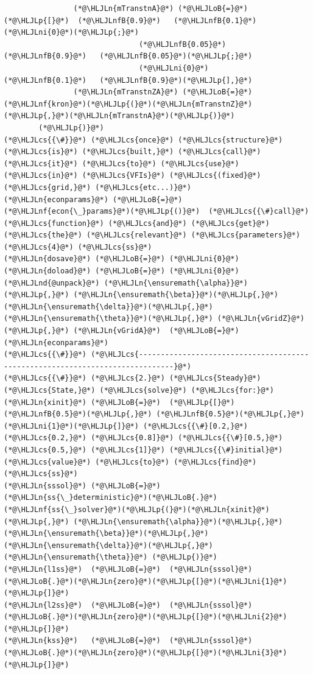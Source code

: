 \documentclass[12pt,a4paper]{article}
\newcommand{\HLJLn}[1]{#1}
\newcommand{\HLJLnd}[1]{\textcolor[RGB]{214,102,97}{#1}}
\newcommand{\HLJLnf}[1]{\textcolor[RGB]{66,102,213}{#1}}
\newcommand{\HLJLnfB}[1]{\textcolor[RGB]{59,151,46}{#1}}
\newcommand{\HLJLni}[1]{\textcolor[RGB]{59,151,46}{#1}}
\newcommand{\HLJLoB}[1]{\textcolor[RGB]{102,102,102}{\textbf{#1}}}
\newcommand{\HLJLp}[1]{#1}
\newcommand{\HLJLcs}[1]{\textcolor[RGB]{153,153,119}{\textit{#1}}}
\begin{document}
\begin{lstlisting}
                (*@\HLJLn{mTranstnA}@*) (*@\HLJLoB{=}@*) (*@\HLJLp{[}@*)  (*@\HLJLnfB{0.9}@*)   (*@\HLJLnfB{0.1}@*)   (*@\HLJLni{0}@*)(*@\HLJLp{;}@*)
                               (*@\HLJLnfB{0.05}@*)  (*@\HLJLnfB{0.9}@*)   (*@\HLJLnfB{0.05}@*)(*@\HLJLp{;}@*)
                               (*@\HLJLni{0}@*)     (*@\HLJLnfB{0.1}@*)   (*@\HLJLnfB{0.9}@*)(*@\HLJLp{],}@*)
                (*@\HLJLn{mTranstnZA}@*) (*@\HLJLoB{=}@*) (*@\HLJLnf{kron}@*)(*@\HLJLp{(}@*)(*@\HLJLn{mTranstnZ}@*)(*@\HLJLp{,}@*)(*@\HLJLn{mTranstnA}@*)(*@\HLJLp{)}@*)
        (*@\HLJLp{)}@*)
(*@\HLJLcs{{\#}}@*) (*@\HLJLcs{once}@*) (*@\HLJLcs{structure}@*) (*@\HLJLcs{is}@*) (*@\HLJLcs{built,}@*) (*@\HLJLcs{call}@*) (*@\HLJLcs{it}@*) (*@\HLJLcs{to}@*) (*@\HLJLcs{use}@*) (*@\HLJLcs{in}@*) (*@\HLJLcs{VFIs}@*) (*@\HLJLcs{(fixed}@*) (*@\HLJLcs{grid,}@*) (*@\HLJLcs{etc...)}@*)
(*@\HLJLn{econparams}@*) (*@\HLJLoB{=}@*) (*@\HLJLnf{econ{\_}params}@*)(*@\HLJLp{()}@*)  (*@\HLJLcs{{\#}call}@*) (*@\HLJLcs{function}@*) (*@\HLJLcs{and}@*) (*@\HLJLcs{get}@*) (*@\HLJLcs{the}@*) (*@\HLJLcs{relevant}@*) (*@\HLJLcs{parameters}@*) (*@\HLJLcs{4}@*) (*@\HLJLcs{ss}@*)
(*@\HLJLn{dosave}@*) (*@\HLJLoB{=}@*) (*@\HLJLni{0}@*)
(*@\HLJLn{doload}@*) (*@\HLJLoB{=}@*) (*@\HLJLni{0}@*)
(*@\HLJLnd{@unpack}@*) (*@\HLJLn{\ensuremath{\alpha}}@*)(*@\HLJLp{,}@*) (*@\HLJLn{\ensuremath{\beta}}@*)(*@\HLJLp{,}@*) (*@\HLJLn{\ensuremath{\delta}}@*)(*@\HLJLp{,}@*) (*@\HLJLn{\ensuremath{\theta}}@*)(*@\HLJLp{,}@*) (*@\HLJLn{vGridZ}@*)(*@\HLJLp{,}@*) (*@\HLJLn{vGridA}@*)  (*@\HLJLoB{=}@*) (*@\HLJLn{econparams}@*)
(*@\HLJLcs{{\#}}@*) (*@\HLJLcs{------------------------------------------------------------------------------}@*)
(*@\HLJLcs{{\#}}@*) (*@\HLJLcs{2.}@*) (*@\HLJLcs{Steady}@*) (*@\HLJLcs{State,}@*) (*@\HLJLcs{solve}@*) (*@\HLJLcs{for:}@*)
(*@\HLJLn{xinit}@*) (*@\HLJLoB{=}@*)  (*@\HLJLp{[}@*)(*@\HLJLnfB{0.5}@*)(*@\HLJLp{,}@*) (*@\HLJLnfB{0.5}@*)(*@\HLJLp{,}@*) (*@\HLJLni{1}@*)(*@\HLJLp{]}@*) (*@\HLJLcs{{\#}[0.2,}@*) (*@\HLJLcs{0.2,}@*) (*@\HLJLcs{0.8]}@*) (*@\HLJLcs{{\#}[0.5,}@*) (*@\HLJLcs{0.5,}@*) (*@\HLJLcs{1]}@*) (*@\HLJLcs{{\#}initial}@*) (*@\HLJLcs{value}@*) (*@\HLJLcs{to}@*) (*@\HLJLcs{find}@*) (*@\HLJLcs{ss}@*)
(*@\HLJLn{sssol}@*) (*@\HLJLoB{=}@*)  (*@\HLJLn{ss{\_}deterministic}@*)(*@\HLJLoB{.}@*)(*@\HLJLnf{ss{\_}solver}@*)(*@\HLJLp{(}@*)(*@\HLJLn{xinit}@*)(*@\HLJLp{,}@*) (*@\HLJLn{\ensuremath{\alpha}}@*)(*@\HLJLp{,}@*) (*@\HLJLn{\ensuremath{\beta}}@*)(*@\HLJLp{,}@*) (*@\HLJLn{\ensuremath{\delta}}@*)(*@\HLJLp{,}@*) (*@\HLJLn{\ensuremath{\theta}}@*) (*@\HLJLp{)}@*)
(*@\HLJLn{l1ss}@*)  (*@\HLJLoB{=}@*)  (*@\HLJLn{sssol}@*)(*@\HLJLoB{.}@*)(*@\HLJLn{zero}@*)(*@\HLJLp{[}@*)(*@\HLJLni{1}@*)(*@\HLJLp{]}@*)
(*@\HLJLn{l2ss}@*)  (*@\HLJLoB{=}@*)  (*@\HLJLn{sssol}@*)(*@\HLJLoB{.}@*)(*@\HLJLn{zero}@*)(*@\HLJLp{[}@*)(*@\HLJLni{2}@*)(*@\HLJLp{]}@*)
(*@\HLJLn{kss}@*)   (*@\HLJLoB{=}@*)  (*@\HLJLn{sssol}@*)(*@\HLJLoB{.}@*)(*@\HLJLn{zero}@*)(*@\HLJLp{[}@*)(*@\HLJLni{3}@*)(*@\HLJLp{]}@*)


\end{lstlisting}
\end{document}
